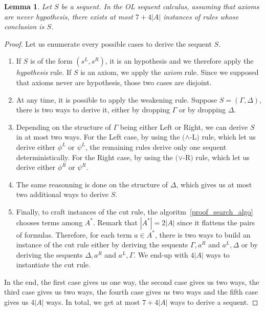 \documentclass[a4paper, 11pt]{article}
\newtheorem{lemma}[theorem]{Lemma}
\begin{document}
    \begin{lemma}\label{lemma_hyperedges_branching}
	    Let $S$ be a sequent. In the OL sequent calculus, assuming that axioms are never hypothesis, 
	    there exists at most $7+4|A|$ instances of rules whose conclusion is $S$.
    \end{lemma}
    \begin{proof}
	    Let us enumerate every possible cases to derive the sequent $S$.
	    \begin{enumerate}
		    \item
			    If $S$ is of the form $(s^L,s^R)$, it is an hypothesis and we therefore
			    apply the \textit{hypothesis} rule. If $S$ is an axiom, we apply the 
			    \textit{axiom} rule. Since
			    we supposed that axioms never are hypothesis, those two cases are
			    disjoint.
		    \item
			    At any time, it is possible to apply the weakening rule. Suppose
			    $S=(\Gamma,\Delta)$, there is two ways to derive it, either by dropping
			    $\Gamma$ or by dropping $\Delta$.
		    \item
			    Depending on the structure of $\Gamma$ being either Left or Right, we
			    can derive $S$ in at most two ways. For the Left case, by using the
			    $(\wedge$-L$)$ rule, which let us derive either $\phi^L$ or $\psi^L$, the
			    remaining rules derive only one sequent deterministically. For the Right
			    case, by using the $(\vee$-R$)$ rule, which let us derive either $\phi^R$
			    or $\psi^R$.
		    \item
			    The same reasonning is done on the structure of $\Delta$, which gives us
			    at most two additional ways to derive $S$.
		    \item
			    Finally, to craft instances of the cut rule, 
			    the algoritm~\ref{proof_search_algo} chooses terms among $A^*$. Remark
			    that $|A^*|=2|A|$ since it flattens the pairs of formulas. Therefore, for 
			    each term $a\in A^*$, there is two ways to build an instance of the cut
			    rule either by deriving the sequents $\Gamma,a^R$ and $a^L,\Delta$ or by
			    deriving the sequents $\Delta,a^R$ and $a^L,\Gamma$.
			    We end-up with $4|A|$ ways to instantiate the cut rule.
	    \end{enumerate}
	    In the end, the first case gives us one way, the second case gives us two ways, the third
	    case gives us two ways, the fourth case gives us two ways and the fifth case gives us
	    $4|A|$ ways. In total, we get at most $7+4|A|$ ways to derive a sequent.
    \end{proof}
\end{document}
